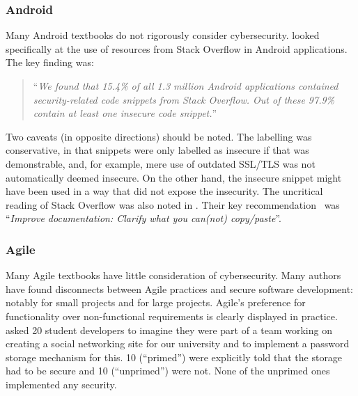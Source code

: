 \documentclass[sigconf]{acmart}
\begin{document}
\subsubsection{Android}\label{sec:Android}
Many Android textbooks do not rigorously consider cybersecurity. \cite{Fischeretal2017a} looked specifically at the use of resources from Stack Overflow in Android applications. The key finding was:

\begin{quote}
	``{\emph{We found that 15.4\% of all 1.3 million Android applications
			contained security-related code snippets from
			Stack Overflow. Out of these 97.9\% contain at least one
			insecure code snippet.}}''
\end{quote}

Two caveats (in opposite directions) should be noted. The labelling was conservative, in that snippets were only labelled as insecure if that was demonstrable, and, for example, mere use of outdated SSL/TLS was not automatically deemed insecure. On the other hand, the insecure snippet might have been used in a way that did not expose the insecurity. The uncritical reading of Stack Overflow was also noted in \cite[Slide 29]{Votipkaetal2019a}. Their key recommendation~\cite[Slide 32]{Votipkaetal2019a} was ``{\emph{Improve documentation: Clarify what you can(not) copy/paste}}''. 

\subsubsection{Agile}
Many Agile textbooks have little consideration of cybersecurity. Many authors have found disconnects between Agile practices and secure software development: notably \cite{Bartsch2011a} for small projects and \cite{vanderHeijden:2018:EPS:3239235.3267426} for large projects. Agile's preference for functionality over non-functional requirements is clearly displayed in practice. \cite{Naiakshinaetal2017a} asked 20 student developers to imagine they were part of a team working on creating a social networking site for our university and to implement a password storage mechanism for this. 10 (``primed'') were explicitly told that the storage had to be secure and 10 (``unprimed'') were not. None of the unprimed ones implemented any security. 
\end{document}
